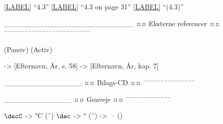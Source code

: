 \ref{LABEL} 		“4.3”
\vref{LABEL} 		“4.3 on page 31”
\eqref{LABEL} 		“(4.3)”

_________________________
¤¤ Eksterne referencer ¤¤
¯¯¯¯¯¯¯¯¯¯¯¯¯¯¯¯¯¯¯¯¯¯¯¯¯

\citep{LABEL} 		(Passiv)
\citet{LABEL} 		(Activ)

\citep[ SIDE, AFSNIT, KAPITEL MV.]{LABEL}

\citep[ s. 58]{fysikbog} 		->		[Efternavn, År, s. 58]
\citep[ kap. 7]{fysikbog} 		->		[Efternavn, År, kap. 7]


_______________
¤¤ Bilags-CD ¤¤
¯¯¯¯¯¯¯¯¯¯¯¯¯¯¯

\citep[ FILNAVN]{cd}


_____________
¤¤ Genveje ¤¤
¯¯¯¯¯¯¯¯¯¯¯¯¯

$\decC$ 		->		°C 		(ˆ{\circ})
$\dec$ 			->		° 		(ˆ{\circ})
\m 				->		· 		(\cdot)


